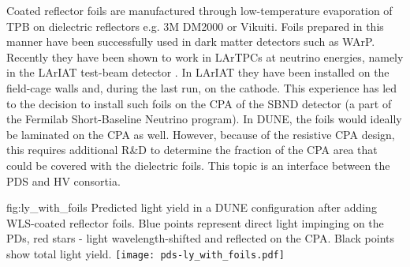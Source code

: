 Coated reflector foils are manufactured through low-temperature evaporation of TPB on dielectric reflectors e.g. 3M DM2000 or Vikuiti. Foils prepared in this manner have been successfully used in dark matter detectors such as WArP\cite{Acciarri:2008kv}. Recently they have been shown to work in LArTPCs at neutrino energies, namely  in the LArIAT test-beam detector \cite{Garcia-Gamez:2017cmu}. In LArIAT they have been installed on the field-cage walls and, during the last run, on the cathode. This experience has led to the decision to install such foils on the CPA of the SBND detector (a part of the Fermilab  Short-Baseline Neutrino program). In DUNE, the foils would ideally be laminated on the CPA as well. However, because of the resistive CPA design, this requires additional R\&D to determine the fraction of the CPA area that could be covered with the dielectric foils. This topic is an interface between the PDS and HV consortia. 

\begin{dunefigure}{fig:ly_with_foils}
{Predicted light yield in a DUNE configuration after adding WLS-coated reflector foils. Blue points represent direct light impinging on the PDs, red stars - light wavelength-shifted and reflected on the CPA. Black points show total light yield.}
\texttt{[image: pds-ly\_with\_foils.pdf]}
\end{dunefigure}


	

